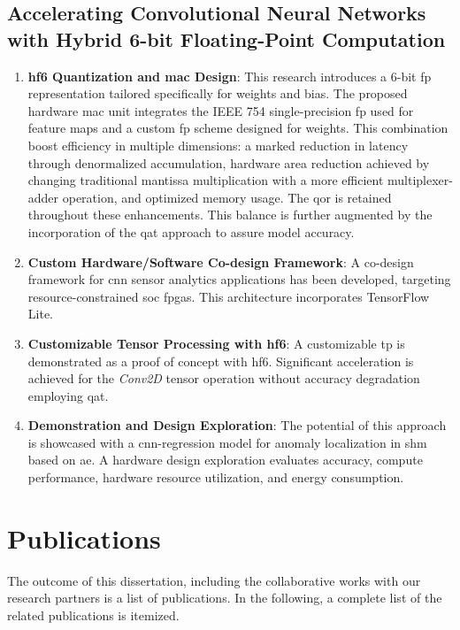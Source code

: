 \subsection{Accelerating Convolutional Neural Networks with Hybrid 6-bit Floating-Point Computation}
\begin{enumerate}
	\item \textbf{\gls{hf6} Quantization and \gls{mac} Design}:
	This research introduces a 6-bit \gls{fp} representation tailored specifically for weights and bias. The proposed hardware \gls{mac} unit integrates the IEEE 754 single-precision \gls{fp} used for feature maps and a custom \gls{fp} scheme designed for weights. This combination boost efficiency in multiple dimensions: a marked reduction in latency through denormalized accumulation, hardware area reduction achieved by changing traditional mantissa multiplication with a more efficient multiplexer-adder operation, and optimized memory usage. The \gls{qor} is retained throughout these enhancements. This balance is further augmented by the incorporation of the \gls{qat} approach to assure model accuracy.
	
	\item \textbf{Custom Hardware/Software Co-design Framework}: 
	A co-design framework for \gls{cnn} sensor analytics applications has been developed, targeting resource-constrained \gls{soc} \glspl{fpga}. This architecture incorporates TensorFlow Lite.
	
	\item \textbf{Customizable Tensor Processing with \gls{hf6}}: 
	A customizable \gls{tp} is demonstrated as a proof of concept with \gls{hf6}. Significant acceleration is achieved for the \emph{Conv2D} tensor operation without accuracy degradation employing \gls{qat}.
	
	\item \textbf{Demonstration and Design Exploration}: 
	The potential of this approach is showcased with a \gls{cnn}-regression model for anomaly localization in \gls{shm} based on \gls{ae}. A hardware design exploration evaluates accuracy, compute performance, hardware resource utilization, and energy consumption.
\end{enumerate}


\section{Publications}
The outcome of this dissertation, including the collaborative works with our research partners is a list of publications. In the following, a complete list of the related publications is itemized.


